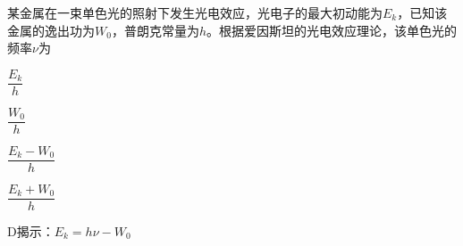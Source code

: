 某金属在一束单色光的照射下发生光电效应，光电子的最大初动能为\(E_k\)，已知该金属的逸出功为\(W_0\)，普朗克常量为\(h\)。根据爱因斯坦的光电效应理论，该单色光的频率\(\nu\)为\paren[D]
\begin{choices}
	\item \(\dfrac{E_k}{h}\)
	\item \(\dfrac{W_0}{h}\)
	\item \(\dfrac{E_k - W_0}{h}\)
	\item \(\dfrac{E_k + W_0}{h}\)
\end{choices}
\begin{answer}
    D\qquad 揭示：\(E_k = h\nu - W_0\)
\end{answer}